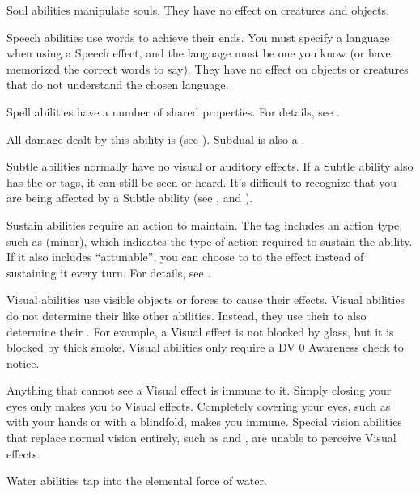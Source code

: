    Soul abilities manipulate souls.
  They have no effect on  creatures and objects.

   Speech abilities use words to achieve their ends.
  You must specify a language when using a Speech effect, and the language must be one you know (or have memorized the correct words to say). They have no effect on objects or creatures that do not understand the chosen language.

   Spell abilities have a number of shared properties.
  For details, see .

   All damage dealt by this ability is  (see ).
  Subdual is also a .

   Subtle abilities normally have no visual or auditory effects.
  If a Subtle ability also has the \atVisual or \atAuditory tags, it can still be seen or heard.
  It's difficult to recognize that you are being affected by a Subtle ability (see , and ).

   Sustain abilities require an action to maintain.
  The tag includes an action type, such as (minor), which indicates the type of action required to sustain the ability.
  If it also includes ``attunable'', you can choose to  to the effect instead of sustaining it every turn.
  For details, see .

   Visual abilities use visible objects or forces to cause their effects.
  Visual abilities do not determine their  like other abilities.
  Instead, they use their  to also determine their .
  For example, a Visual effect is not blocked by glass, but it is blocked by thick smoke.
  Visual abilities only require a DV 0 Awareness check to notice.

  Anything that cannot see a Visual effect is immune to it.
  Simply closing your eyes only makes you \resistant to Visual effects.
  Completely covering your eyes, such as with your hands or with a blindfold, makes you immune.
  Special vision abilities that replace normal vision entirely, such as  and , are unable to perceive Visual effects.

   Water abilities tap into the elemental force of water.

